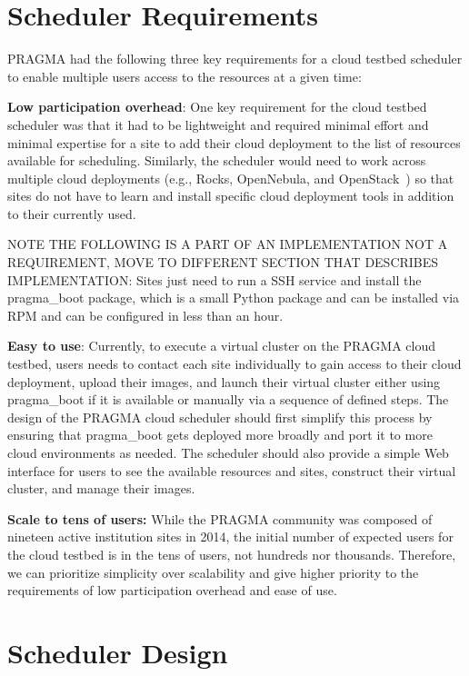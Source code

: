 \documentclass{acm_proc_article-sp}
\begin{document}
\section{Scheduler Requirements}

PRAGMA had the following three key requirements for a cloud testbed scheduler to enable multiple users access to the resources at a  given time:

\textbf{Low participation overhead}:  One key requirement for the cloud testbed scheduler was that it had to be lightweight and required  minimal effort and minimal expertise for a site to add their cloud deployment to the list of resources available for scheduling.   Similarly, the scheduler would need to work across multiple cloud deployments (e.g., Rocks, OpenNebula, and OpenStack~\cite{openstack}) so that sites do not have to learn and install specific cloud deployment tools in addition to their currently used.  

NOTE THE FOLLOWING IS A PART OF AN IMPLEMENTATION NOT A REQUIREMENT, MOVE TO DIFFERENT SECTION THAT DESCRIBES IMPLEMENTATION: Sites  just need to run a SSH service and install the pragma\_boot package, which is a small Python package and can be installed via RPM and can be configured in less than an hour.

\textbf{Easy to use}:  Currently, to execute a virtual cluster on the PRAGMA cloud testbed, users needs to contact each site individually to gain access to their cloud deployment, upload their images, and launch their virtual cluster either using pragma\_boot  if it is available or manually via a sequence of defined steps.   The design of the PRAGMA cloud scheduler should first simplify this process by ensuring that pragma\_boot gets deployed more broadly and port it to more cloud environments as needed.   The scheduler should also provide a simple Web interface for users to see the available resources and sites, construct their virtual cluster, and manage their images.

\textbf{Scale to tens of users:}  While the PRAGMA community was composed of nineteen active institution sites in 2014, the initial number of expected users for the cloud testbed is in the tens of users, not hundreds nor thousands.  Therefore, we can prioritize simplicity over scalability and give higher priority to the requirements of low participation overhead and ease of use.

\section{Scheduler Design}
\label{Sec:Design}
\end{document}
